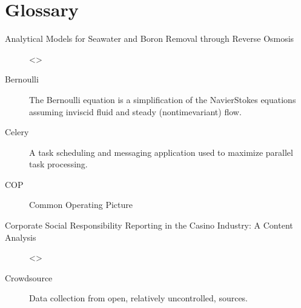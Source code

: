 \documentclass[letterpaper,10pt,english]{sphinxmanual}
\begin{document}
\chapter{Glossary}
\label{\detokenize{glossary:glossary}}\label{\detokenize{glossary::doc}}\begin{description}
\item[{Analytical Models for Seawater and Boron Removal through Reverse Osmosis\label{\detokenize{glossary:term-Analytical-Models-for-Seawater-and-Boron-Removal-through-Reverse-Osmosis}}}] \leavevmode
\sphinxAtStartPar
\textless{}\textgreater{}

\item[{Bernoulli\label{\detokenize{glossary:term-Bernoulli}}}] \leavevmode
\sphinxAtStartPar
The Bernoulli equation is a simplification of the Navier\sphinxhyphen{}Stokes equations assuming inviscid fluid and steady (non\sphinxhyphen{}time\sphinxhyphen{}variant) flow.

\item[{Celery\label{\detokenize{glossary:term-Celery}}}] \leavevmode
\sphinxAtStartPar
A task scheduling and messaging application used to maximize parallel task processing.

\item[{COP\label{\detokenize{glossary:term-COP}}}] \leavevmode
\sphinxAtStartPar
Common Operating Picture

\item[{Corporate Social Responsibility Reporting in the Casino Industry: A Content Analysis\label{\detokenize{glossary:term-Corporate-Social-Responsibility-Reporting-in-the-Casino-Industry-A-Content-Analysis}}}] \leavevmode
\sphinxAtStartPar
\textless{}\textgreater{}

\item[{Crowdsource\label{\detokenize{glossary:term-Crowdsource}}}] \leavevmode
\sphinxAtStartPar
Data collection from open, relatively un\sphinxhyphen{}controlled, sources.


\end{description}
\end{document}
